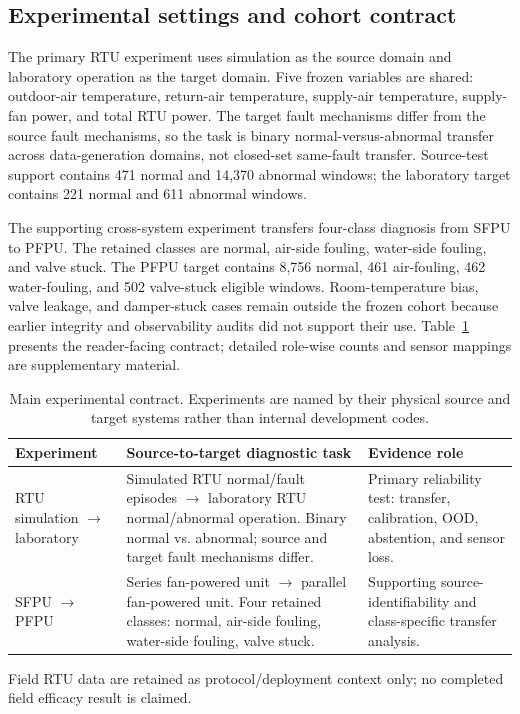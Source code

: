\documentclass[preprint,12pt]{elsarticle}
\begin{document}
\subsection{Experimental settings and cohort contract}
The primary RTU experiment uses simulation as the source domain and laboratory operation as the target domain. Five frozen variables are shared: outdoor-air temperature, return-air temperature, supply-air temperature, supply-fan power, and total RTU power. The target fault mechanisms differ from the source fault mechanisms, so the task is binary normal-versus-abnormal transfer across data-generation domains, not closed-set same-fault transfer. Source-test support contains 471 normal and 14,370 abnormal windows; the laboratory target contains 221 normal and 611 abnormal windows.

The supporting cross-system experiment transfers four-class diagnosis from SFPU to PFPU. The retained classes are normal, air-side fouling, water-side fouling, and valve stuck. The PFPU target contains 8,756 normal, 461 air-fouling, 462 water-fouling, and 502 valve-stuck eligible windows. Room-temperature bias, valve leakage, and damper-stuck cases remain outside the frozen cohort because earlier integrity and observability audits did not support their use. Table~\ref{tab:contract} presents the reader-facing contract; detailed role-wise counts and sensor mappings are supplementary material.

\begin{table}[H]
\centering
\caption{Main experimental contract. Experiments are named by their physical source and target systems rather than internal development codes.}
\label{tab:contract}
\begin{threeparttable}
\small
\setlength{\tabcolsep}{4pt}
\begin{tabularx}{\textwidth}{>{\raggedright\arraybackslash}p{2.6cm}>{\raggedright\arraybackslash}X>{\raggedright\arraybackslash}p{4.0cm}}
\toprule
Experiment & Source-to-target diagnostic task & Evidence role \\
\midrule
RTU simulation $\rightarrow$ laboratory & Simulated RTU normal/fault episodes $\rightarrow$ laboratory RTU normal/abnormal operation. Binary normal vs. abnormal; source and target fault mechanisms differ. & Primary reliability test: transfer, calibration, OOD, abstention, and sensor loss. \\
SFPU $\rightarrow$ PFPU & Series fan-powered unit $\rightarrow$ parallel fan-powered unit. Four retained classes: normal, air-side fouling, water-side fouling, valve stuck. & Supporting source-identifiability and class-specific transfer analysis. \\
\bottomrule
\end{tabularx}
\begin{tablenotes}[flushleft]\footnotesize
\item Field RTU data are retained as protocol/deployment context only; no completed field efficacy result is claimed.
\end{tablenotes}
\end{threeparttable}
\end{table}
\end{document}

